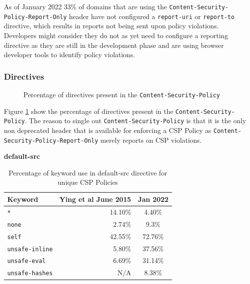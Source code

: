 \documentclass{mscreport}
\begin{document}
\vspace{0.3cm} \noindent
As of January 2022 33\% of domains that are using the \newline \texttt{Content-Security-Policy-Report-Only} header have not configured a \texttt{report-uri} or \texttt{report-to} directive, which results in reports not being sent upon policy violations. Developers might consider they do not as yet need to configure a reporting directive as they are still in the development phase and are using browser developer tools to identify policy violations.

\clearpage
\newpage

\subsubsection{Directives}

\begin{figure}[H]
	\begin{center}
		\caption{Percentage of directives present in the \texttt{Content-Security-Policy}}
		\label{fig:csp_csp_by_directives}
	\end{center}
\end{figure}

Figure \ref{fig:csp_csp_by_directives} show the percentage of directives present in the \texttt{Content-Security-Policy}. The reason to single out \texttt{Content-Security-Policy} is that it is the only non deprecated header that is available for enforcing a CSP Policy as \texttt{Content-Security-Policy-Report-Only} merely reports on CSP violations.

\vspace{0.7cm} \noindent
\textbf{default-src}

\begin{table}[H]
  \begin{center}
    \begin{tabular}{|l|D|c|}  %
      \hline
      \textbf{Keyword} & \textbf{Ying et al} \cite{Ying2016-ag} June 2015 & Jan 2022 \\
      \hline
      \texttt{*} & 14.10\% & 4.40\%\\
      \hline
      \texttt{none} & 2.74\% & 9.3\%\\
      \hline
      \texttt{self} & 42.55\% & 72.76\%\\
      \hline
      \texttt{unsafe-inline} & 5.80\% & 37.56\%\\
      \hline
      \texttt{unsafe-eval} & 6.69\% & 31.14\%\\
      \hline
      \texttt{unsafe-hashes} & N/A & 8.38\%\\
      \hline
    \end{tabular}
    \caption{Percentage of keyword use in default-src directive for unique CSP Policies}
    \label{table:csp_default-src-keyword} %
  \end{center}
\end{table}
\end{document}
